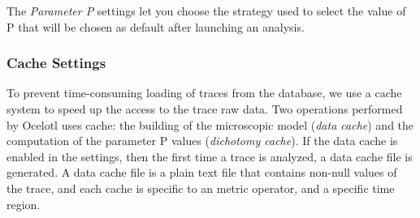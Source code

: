 \documentclass[twoside]{article}
\begin{document}
\begin{sloppypar}
The \textit{Parameter P} settings let you choose the strategy used to select the value of P that will be chosen as default after launching an analysis.

\subsubsection{Cache Settings}
To prevent time-consuming loading of traces from the database, we use a cache system to speed up the access to the trace raw data. Two operations performed by Ocelotl uses cache: the building of the microscopic model (\emph{data cache}) and the computation of the parameter P values (\emph{dichotomy cache}). If the data cache is enabled in the settings, then the first time a trace is analyzed, a data cache file is generated. A data cache file is a plain text file that contains non-null values of the trace, and each cache is specific to an metric operator, and a specific time region. 


\end{sloppypar}
\end{document}
